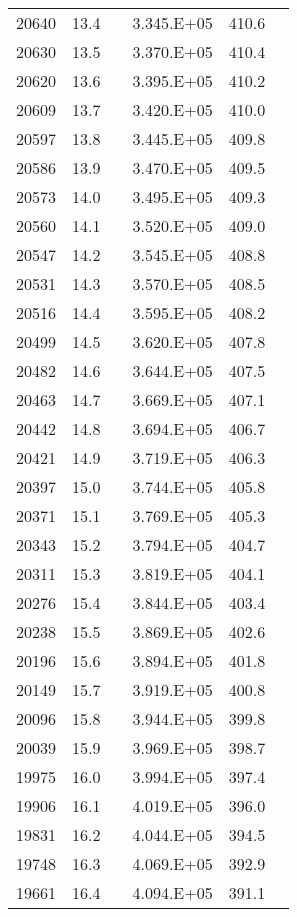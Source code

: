 \begin{longtable}{cccccc}
  20640 & 13.4 &  & 3.345.E+05 & 410.6 &  \\
  20630 & 13.5 &  & 3.370.E+05 & 410.4 &  \\
  20620 & 13.6 &  & 3.395.E+05 & 410.2 &  \\
  20609 & 13.7 &  & 3.420.E+05 & 410.0 &  \\
  20597 & 13.8 &  & 3.445.E+05 & 409.8 &  \\
  20586 & 13.9 &  & 3.470.E+05 & 409.5 &  \\
  20573 & 14.0 &  & 3.495.E+05 & 409.3 &  \\
  20560 & 14.1 &  & 3.520.E+05 & 409.0 &  \\
  20547 & 14.2 &  & 3.545.E+05 & 408.8 &  \\
  20531 & 14.3 &  & 3.570.E+05 & 408.5 &  \\
  20516 & 14.4 &  & 3.595.E+05 & 408.2 &  \\
  20499 & 14.5 &  & 3.620.E+05 & 407.8 &  \\
  20482 & 14.6 &  & 3.644.E+05 & 407.5 &  \\
  20463 & 14.7 &  & 3.669.E+05 & 407.1 &  \\
  20442 & 14.8 &  & 3.694.E+05 & 406.7 &  \\
  20421 & 14.9 &  & 3.719.E+05 & 406.3 &  \\
  20397 & 15.0 &  & 3.744.E+05 & 405.8 &  \\
  20371 & 15.1 &  & 3.769.E+05 & 405.3 &  \\
  20343 & 15.2 &  & 3.794.E+05 & 404.7 &  \\
  20311 & 15.3 &  & 3.819.E+05 & 404.1 &  \\
  20276 & 15.4 &  & 3.844.E+05 & 403.4 &  \\
  20238 & 15.5 &  & 3.869.E+05 & 402.6 &  \\
  20196 & 15.6 &  & 3.894.E+05 & 401.8 &  \\
  20149 & 15.7 &  & 3.919.E+05 & 400.8 &  \\
  20096 & 15.8 &  & 3.944.E+05 & 399.8 &  \\
  20039 & 15.9 &  & 3.969.E+05 & 398.7 &  \\
  19975 & 16.0 &  & 3.994.E+05 & 397.4 &  \\
  19906 & 16.1 &  & 4.019.E+05 & 396.0 &  \\
  19831 & 16.2 &  & 4.044.E+05 & 394.5 &  \\
  19748 & 16.3 &  & 4.069.E+05 & 392.9 &  \\
  19661 & 16.4 &  & 4.094.E+05 & 391.1 &  \\

\end{longtable}
